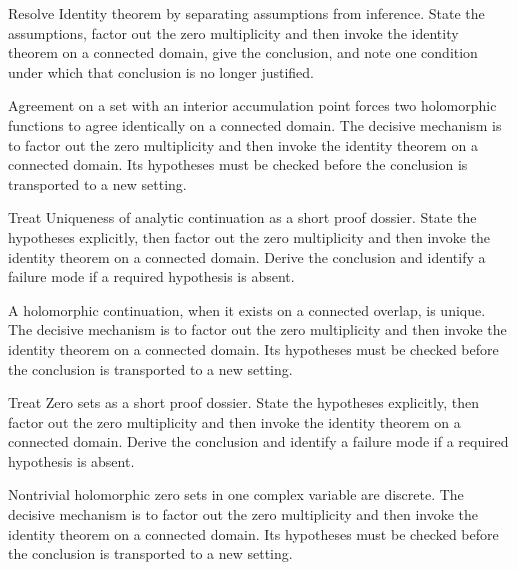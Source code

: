 \begin{problem}\label{prob:iv07-problem-04}
Resolve Identity theorem by separating assumptions from inference. State the assumptions, factor out the zero multiplicity and then invoke the identity theorem on a connected domain, give the conclusion, and note one condition under which that conclusion is no longer justified.
\end{problem}
\begin{solution}
Agreement on a set with an interior accumulation point forces two holomorphic functions to agree identically on a connected domain. The decisive mechanism is to factor out the zero multiplicity and then invoke the identity theorem on a connected domain. Its hypotheses must be checked before the conclusion is transported to a new setting.
\end{solution}

\begin{problem}\label{prob:iv07-problem-05}
Treat Uniqueness of analytic continuation as a short proof dossier. State the hypotheses explicitly, then factor out the zero multiplicity and then invoke the identity theorem on a connected domain. Derive the conclusion and identify a failure mode if a required hypothesis is absent.
\end{problem}
\begin{solution}
A holomorphic continuation, when it exists on a connected overlap, is unique. The decisive mechanism is to factor out the zero multiplicity and then invoke the identity theorem on a connected domain. Its hypotheses must be checked before the conclusion is transported to a new setting.
\end{solution}

\begin{problem}\label{prob:iv07-problem-06}
Treat Zero sets as a short proof dossier. State the hypotheses explicitly, then factor out the zero multiplicity and then invoke the identity theorem on a connected domain. Derive the conclusion and identify a failure mode if a required hypothesis is absent.
\end{problem}
\begin{solution}
Nontrivial holomorphic zero sets in one complex variable are discrete. The decisive mechanism is to factor out the zero multiplicity and then invoke the identity theorem on a connected domain. Its hypotheses must be checked before the conclusion is transported to a new setting.
\end{solution}

